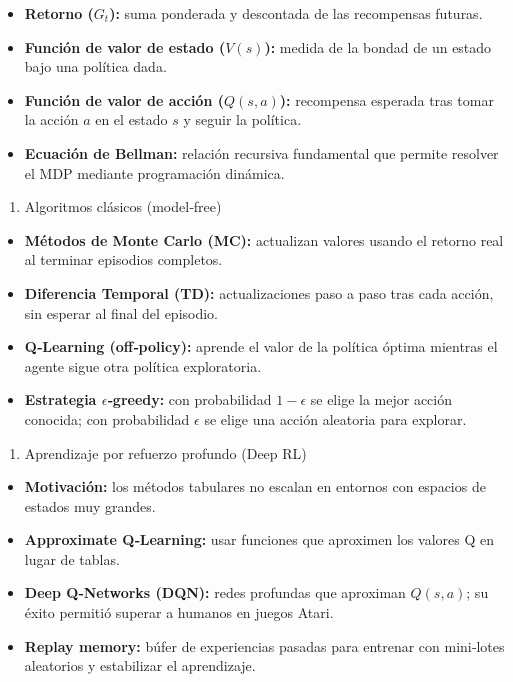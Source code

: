 \documentclass[12pt]{book} %
\providecommand{\tightlist}{%
  \setlength{\itemsep}{0pt}\setlength{\parskip}{0pt}}
\begin{document}
\begin{itemize}
\tightlist
\item
  \textbf{Retorno (\(G_t\)):} suma ponderada y descontada de las
  recompensas futuras.
\item
  \textbf{Función de valor de estado (\(V(s)\)):} medida de la bondad de
  un estado bajo una política dada.
\item
  \textbf{Función de valor de acción (\(Q(s,a)\)):} recompensa esperada
  tras tomar la acción \(a\) en el estado \(s\) y seguir la política.
\item
  \textbf{Ecuación de Bellman:} relación recursiva fundamental que
  permite resolver el MDP mediante programación dinámica.
\end{itemize}

\begin{enumerate}
\def\labelenumi{\arabic{enumi}.}
\setcounter{enumi}{3}
\tightlist
\item
  Algoritmos clásicos (model‑free)
\end{enumerate}

\begin{itemize}
\tightlist
\item
  \textbf{Métodos de Monte Carlo (MC):} actualizan valores usando el
  retorno real al terminar episodios completos.
\item
  \textbf{Diferencia Temporal (TD):} actualizaciones paso a paso tras
  cada acción, sin esperar al final del episodio.
\item
  \textbf{Q‑Learning (off‑policy):} aprende el valor de la política
  óptima mientras el agente sigue otra política exploratoria.
\item
  \textbf{Estrategia \(\epsilon\)‑greedy:} con probabilidad
  \(1-\epsilon\) se elige la mejor acción conocida; con probabilidad
  \(\epsilon\) se elige una acción aleatoria para explorar.
\end{itemize}

\begin{enumerate}
\def\labelenumi{\arabic{enumi}.}
\setcounter{enumi}{4}
\tightlist
\item
  Aprendizaje por refuerzo profundo (Deep RL)
\end{enumerate}

\begin{itemize}
\tightlist
\item
  \textbf{Motivación:} los métodos tabulares no escalan en entornos con
  espacios de estados muy grandes.
\item
  \textbf{Approximate Q‑Learning:} usar funciones que aproximen los
  valores Q en lugar de tablas.
\item
  \textbf{Deep Q‑Networks (DQN):} redes profundas que aproximan
  \(Q(s,a)\); su éxito permitió superar a humanos en juegos Atari.
\item
  \textbf{Replay memory:} búfer de experiencias pasadas para entrenar
  con mini‑lotes aleatorios y estabilizar el aprendizaje.
\end{itemize}
\end{document}
